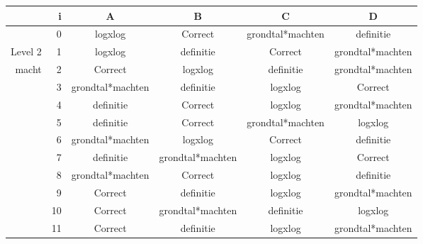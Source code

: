 \begin{tabular}{ rr| c|c|c|c}\hline\hline
     & i & \textbf{A} & \textbf{B} & \textbf{C} & \textbf{D}\\\hline

&0&logxlog&Correct\cellcolor[gray]{0.6}&grondtal*machten&definitie\\
Level 2 & 1&logxlog&definitie&Correct\cellcolor[gray]{0.6}&grondtal*machten\\
macht &2&Correct\cellcolor[gray]{0.6}&logxlog&definitie&grondtal*machten\\
&3&grondtal*machten&definitie&logxlog&Correct\cellcolor[gray]{0.6}\\
&4&definitie&Correct\cellcolor[gray]{0.6}&logxlog&grondtal*machten\\
&5&definitie&Correct\cellcolor[gray]{0.6}&grondtal*machten&logxlog\\
&6&grondtal*machten&logxlog&Correct\cellcolor[gray]{0.6}&definitie\\
&7&definitie&grondtal*machten&logxlog&Correct\cellcolor[gray]{0.6}\\
&8&grondtal*machten&Correct\cellcolor[gray]{0.6}&logxlog&definitie\\
&9&Correct\cellcolor[gray]{0.6}&definitie&logxlog&grondtal*machten\\
&10&Correct\cellcolor[gray]{0.6}&grondtal*machten&definitie&logxlog\\
&11&Correct\cellcolor[gray]{0.6}&definitie&logxlog&grondtal*machten\\
\hline\end{tabular}\par\ \newline

